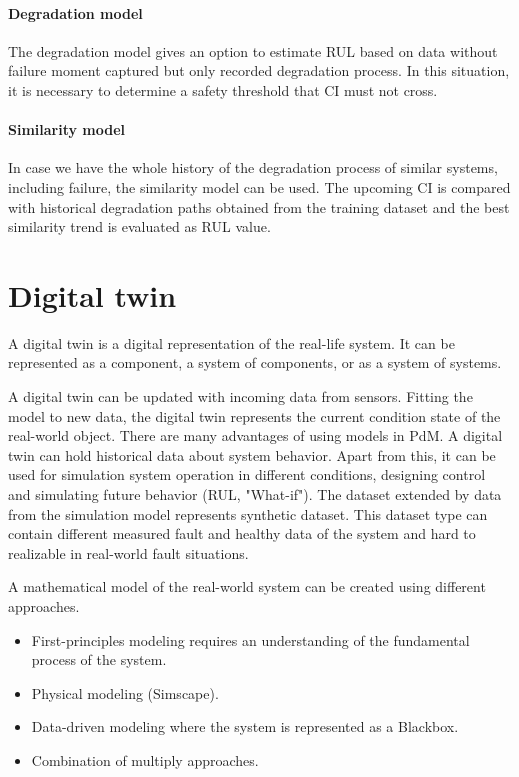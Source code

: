 \paragraph{Degradation model}
The degradation model gives an option to estimate RUL based on data without
failure moment captured but only recorded degradation process. In this
situation, it is necessary to determine a safety threshold that CI must not
cross.

\paragraph{Similarity model}
In case we have the whole history of the degradation process of similar
systems, including failure, the similarity model can be used. The upcoming
CI is compared with historical degradation paths obtained from the training
dataset and the best similarity trend is evaluated as RUL value.

\section{Digital twin}\label{sec:digital_twin}
A digital twin is a digital representation of the real-life system. It can
be represented as a component, a system of components, or as a system of
systems. 

A digital twin can be updated with incoming data from sensors.
Fitting the model to new data, the digital twin represents the current
condition state of the real-world object.  There are many advantages of
using models in PdM. A digital twin can hold historical data about system
behavior. Apart from this, it can be used for simulation system operation
in different conditions, designing control and simulating future behavior
(RUL, "What-if"). The dataset extended by data from the simulation model
represents synthetic dataset. This dataset type can contain different
measured fault and healthy data of the system and hard to realizable in
real-world fault situations. 

A mathematical model of the real-world system can be created using
different approaches. 
\begin{itemize}
    \item First-principles modeling requires an understanding of the
        fundamental process of the system.
    \item Physical modeling (Simscape).
    \item Data-driven modeling where the system is represented as a Blackbox.
    \item Combination of multiply approaches.
\end{itemize}

